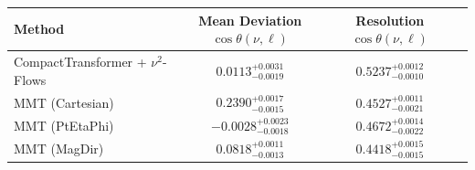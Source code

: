     \begin{tabular}{lccc}
        \toprule
        Method & Mean Deviation $\cos\theta(\nu, \ell)$ & Resolution $\cos\theta(\nu, \ell)$ \\
        \midrule
        CompactTransformer + $\nu^2$-Flows & $0.0113^{+0.0031}_{-0.0019}$ & $0.5237^{+0.0012}_{-0.0010}$ \\
        MMT (Cartesian) & $0.2390^{+0.0017}_{-0.0015}$ & $0.4527^{+0.0011}_{-0.0021}$ \\
        MMT (PtEtaPhi) & $-0.0028^{+0.0023}_{-0.0018}$ & $0.4672^{+0.0014}_{-0.0022}$ \\
        MMT (MagDir) & $0.0818^{+0.0011}_{-0.0013}$ & $0.4418^{+0.0015}_{-0.0015}$ \\
        \bottomrule
    \end{tabular}